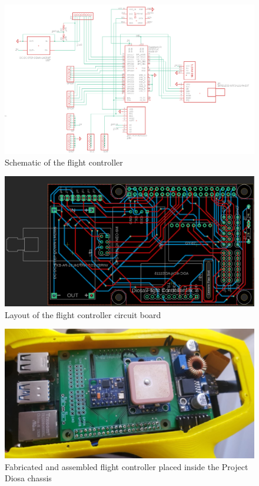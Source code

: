 \documentclass[english]{upeeei}
\begin{document}
\begin{figure}[h]
    \centering
    \includegraphics[scale=0.6]{images/fc_schematic.PNG}
    \caption{Schematic of the flight controller}
    \label{fig:fc_schematic}
\end{figure}
\begin{figure}[h]
    \centering
    \includegraphics[scale=0.5]{images/fc_layout.PNG}
    \caption{Layout of the flight controller circuit board}
    \label{fig:fc_layout}
\end{figure}
\begin{figure}[h]
    \centering
    \includegraphics[scale=1]{images/fc_fab.PNG}
    \caption{Fabricated and assembled flight controller placed inside the Project Diosa chassis}
    \label{fig:fc_fab}
\end{figure}
\end{document}

